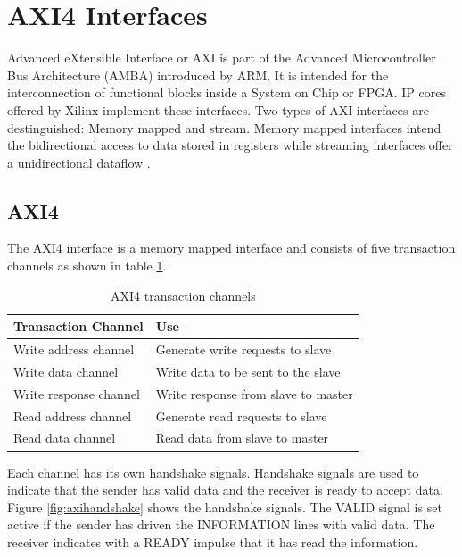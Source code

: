 %
%
\section{AXI4 Interfaces} \label{chapt:theory:axi4interfaces}
Advanced eXtensible Interface or AXI is part of the Advanced Microcontroller Bus
Architecture (AMBA\textregistered) introduced by ARM\textregistered  \cite{axispecs}. 
It is intended for the interconnection of functional blocks inside a System on
Chip or FPGA. IP cores offered by Xilinx implement these interfaces. Two types
of AXI interfaces are destinguished: Memory mapped and stream. Memory mapped
interfaces intend the bidirectional access to data stored in registers while
streaming interfaces offer a unidirectional dataflow \cite{axistreamspecs}.

\subsection{AXI4} \label{chapt:theory:axi4}
The AXI4 interface is a memory mapped interface and consists of five transaction
channels as shown in table
\ref{tab:axi4transchan}. 

\begin{table}[h]
    \centering
    \begin{tabular}{ l  l}
        \toprule
        Transaction Channel & Use \\
        \midrule
        Write address channel & Generate write requests to slave \\
        Write data channel & Write data to be sent to the slave \\
        Write response channel & Write response from slave to master \\
        Read address channel & Generate read requests to slave \\
        Read data channel & Read data from slave to master \\
        \bottomrule
    \end{tabular}
    \caption{AXI4 transaction channels}
    \label{tab:axi4transchan}
\end{table}

Each channel has its own handshake signals. Handshake signals are used to
indicate that the sender has valid data and the receiver is ready to accept
data. Figure \ref{fig:axihandshake} shows the handshake signals. The VALID
signal is set active if the sender has driven the INFORMATION lines with valid
data. The receiver indicates with a READY impulse that it has read the
information. 

